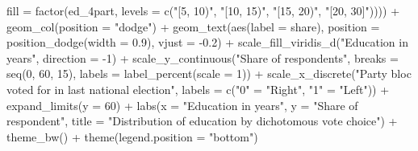 \documentclass[
]{article}
\newenvironment{Shaded}{\begin{snugshade}}{\end{snugshade}}
\newcommand{\AttributeTok}[1]{\textcolor[rgb]{0.77,0.63,0.00}{#1}}
\newcommand{\DecValTok}[1]{\textcolor[rgb]{0.00,0.00,0.81}{#1}}
\newcommand{\FloatTok}[1]{\textcolor[rgb]{0.00,0.00,0.81}{#1}}
\newcommand{\FunctionTok}[1]{\textcolor[rgb]{0.00,0.00,0.00}{#1}}
\newcommand{\NormalTok}[1]{#1}
\newcommand{\OtherTok}[1]{\textcolor[rgb]{0.56,0.35,0.01}{#1}}
\newcommand{\SpecialCharTok}[1]{\textcolor[rgb]{0.00,0.00,0.00}{#1}}
\newcommand{\StringTok}[1]{\textcolor[rgb]{0.31,0.60,0.02}{#1}}
\begin{document}
\begin{Shaded}
\begin{Highlighting}[]
             \AttributeTok{fill =} \FunctionTok{factor}\NormalTok{(ed\_4part, }
                           \AttributeTok{levels =} \FunctionTok{c}\NormalTok{(}\StringTok{"[5, 10)"}\NormalTok{, }\StringTok{"[10, 15)"}\NormalTok{, }
                                      \StringTok{"[15, 20)"}\NormalTok{, }\StringTok{"[20, 30]"}\NormalTok{)))) }\SpecialCharTok{+}
  \FunctionTok{geom\_col}\NormalTok{(}\AttributeTok{position =} \StringTok{"dodge"}\NormalTok{) }\SpecialCharTok{+}
  \FunctionTok{geom\_text}\NormalTok{(}\FunctionTok{aes}\NormalTok{(}\AttributeTok{label =}\NormalTok{ share), }
            \AttributeTok{position =} \FunctionTok{position\_dodge}\NormalTok{(}\AttributeTok{width =} \FloatTok{0.9}\NormalTok{),}
            \AttributeTok{vjust =} \SpecialCharTok{{-}}\FloatTok{0.2}\NormalTok{) }\SpecialCharTok{+}
  \FunctionTok{scale\_fill\_viridis\_d}\NormalTok{(}\StringTok{"Education in years"}\NormalTok{, }\AttributeTok{direction =} \SpecialCharTok{{-}}\DecValTok{1}\NormalTok{) }\SpecialCharTok{+}
  \FunctionTok{scale\_y\_continuous}\NormalTok{(}\StringTok{"Share of respondents"}\NormalTok{,}
                     \AttributeTok{breaks =} \FunctionTok{seq}\NormalTok{(}\DecValTok{0}\NormalTok{, }\DecValTok{60}\NormalTok{, }\DecValTok{15}\NormalTok{),}
                     \AttributeTok{labels =} \FunctionTok{label\_percent}\NormalTok{(}\AttributeTok{scale =} \DecValTok{1}\NormalTok{)) }\SpecialCharTok{+}
  \FunctionTok{scale\_x\_discrete}\NormalTok{(}\StringTok{"Party bloc voted for in last national election"}\NormalTok{, }
                   \AttributeTok{labels =} \FunctionTok{c}\NormalTok{(}\StringTok{"0"} \OtherTok{=} \StringTok{"Right"}\NormalTok{, }
                              \StringTok{"1"} \OtherTok{=} \StringTok{"Left"}\NormalTok{)) }\SpecialCharTok{+}
  \FunctionTok{expand\_limits}\NormalTok{(}\AttributeTok{y =} \DecValTok{60}\NormalTok{) }\SpecialCharTok{+}
  \FunctionTok{labs}\NormalTok{(}\AttributeTok{x =} \StringTok{"Education in years"}\NormalTok{, }\AttributeTok{y =} \StringTok{"Share of respondent"}\NormalTok{,}
       \AttributeTok{title =} \StringTok{"Distribution of education by dichotomous vote choice"}\NormalTok{) }\SpecialCharTok{+}
  \FunctionTok{theme\_bw}\NormalTok{() }\SpecialCharTok{+}
  \FunctionTok{theme}\NormalTok{(}\AttributeTok{legend.position =} \StringTok{"bottom"}\NormalTok{)}
\end{Highlighting}
\end{Shaded}
\end{document}
